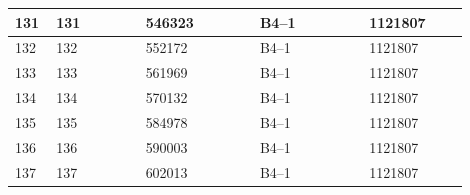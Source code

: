 \documentclass[UTF8,10pt,a4paper,fontset=fandol]{ctexart}
\newcommand{\fieldvalue}[1]{#1}
\begin{document}
\begin{center}
\begin{tabular}{|p{0.07\linewidth}|p{0.18\linewidth}|p{0.23\linewidth}|p{0.22\linewidth}|p{0.20\linewidth}|}
\hline
131 &
\fieldvalue{131} &
\fieldvalue{546323} &
\fieldvalue{B4--1} &
\fieldvalue{1121807} & \\
\hline
132 &
\fieldvalue{132} &
\fieldvalue{552172} &
\fieldvalue{B4--1} &
\fieldvalue{1121807} & \\
\hline
133 &
\fieldvalue{133} &
\fieldvalue{561969} &
\fieldvalue{B4--1} &
\fieldvalue{1121807} & \\
\hline
134 &
\fieldvalue{134} &
\fieldvalue{570132} &
\fieldvalue{B4--1} &
\fieldvalue{1121807} & \\
\hline
135 &
\fieldvalue{135} &
\fieldvalue{584978} &
\fieldvalue{B4--1} &
\fieldvalue{1121807} & \\
\hline
136 &
\fieldvalue{136} &
\fieldvalue{590003} &
\fieldvalue{B4--1} &
\fieldvalue{1121807} & \\
\hline
137 &
\fieldvalue{137} &
\fieldvalue{602013} &
\fieldvalue{B4--1} &
\fieldvalue{1121807} & \\

\end{tabular}
\end{center}
\end{document}
